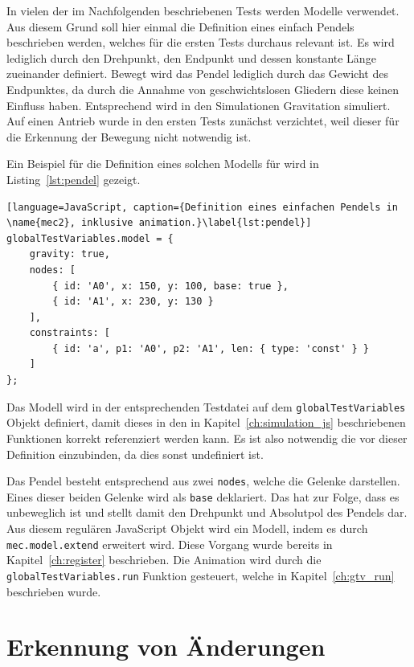 In vielen der im Nachfolgenden beschriebenen Tests werden  Modelle verwendet.
Aus diesem Grund soll hier einmal die Definition eines einfach Pendels beschrieben werden, welches für die ersten Tests durchaus relevant ist.
Es wird lediglich durch den Drehpunkt, den Endpunkt und dessen konstante Länge zueinander definiert.
Bewegt wird das Pendel lediglich durch das Gewicht des Endpunktes, da durch die Annahme von geschwichtslosen Gliedern diese keinen Einfluss haben.
Entsprechend wird in den  Simulationen Gravitation simuliert.
Auf einen Antrieb wurde in den ersten Tests zunächst verzichtet, weil dieser für die Erkennung der Bewegung nicht notwendig ist.

Ein Beispiel für die Definition eines solchen Modells für  wird in Listing~\ref{lst:pendel} gezeigt.

\begin{lstlisting}[language=JavaScript, caption={Definition eines einfachen Pendels in \name{mec2}, inklusive animation.}\label{lst:pendel}]
globalTestVariables.model = {
    gravity: true,
    nodes: [
        { id: 'A0', x: 150, y: 100, base: true },
        { id: 'A1', x: 230, y: 130 }
    ],
    constraints: [
        { id: 'a', p1: 'A0', p2: 'A1', len: { type: 'const' } }
    ]
};
\end{lstlisting}

Das  Modell wird in der entsprechenden Testdatei  auf dem \lstinline{globalTestVariables} Objekt definiert, damit dieses in den in Kapitel~\ref{ch:simulation_js} beschriebenen Funktionen korrekt referenziert werden kann.
Es ist also notwendig die  vor dieser Definition einzubinden, da dies sonst undefiniert ist.

Das Pendel besteht entsprechend aus zwei \lstinline{nodes}, welche die Gelenke darstellen.
Eines dieser beiden Gelenke wird als \lstinline{base} deklariert.
Das hat zur Folge, dass es unbeweglich ist und stellt damit den Drehpunkt und Absolutpol des Pendels dar.
Aus diesem regulären JavaScript Objekt wird ein  Modell, indem es durch \lstinline{mec.model.extend} erweitert wird.
Diese Vorgang wurde bereits in Kapitel~\ref{ch:register} beschrieben.
Die Animation wird durch die \lstinline{globalTestVariables.run} Funktion gesteuert, welche in Kapitel~\ref{ch:gtv_run} beschrieben wurde.

\section{Erkennung von Änderungen}\label{ch:erkennung_von_änderungen}

